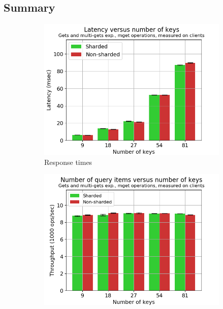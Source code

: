 \documentclass[11pt,a4paper]{article}
\begin{document}
\subsection{Summary} \label{sec:gmg-summary}
\begin{figure}[h!]
\begin{subfigure}{.5\textwidth}
  \centering
  \includegraphics[width=1.0\linewidth ,trim={5px 0px 20px 0px},clip]{img/plot/gmg-extra-mget-lat_cli.png}
  \caption{Response times}
  \label{fig:gmg-extra-mget-lat_cli}
\end{subfigure}%
\begin{subfigure}{.5\textwidth}
  \centering
  \includegraphics[width=1.0\linewidth ,trim={5px 0px 20px 0px},clip]{img/plot/gmg-extra-mget-nitems_cli.png}

\end{subfigure}
\end{figure}
\end{document}
